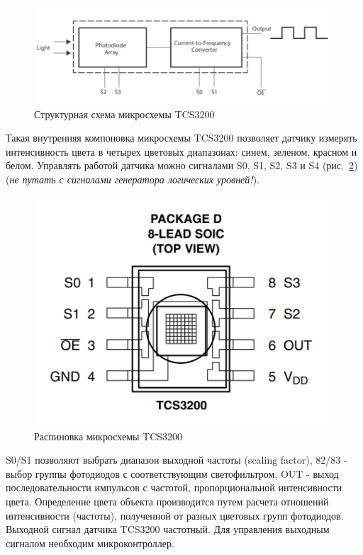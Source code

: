 \documentclass[12pt]{article}
\begin{document}
\begin{figure}[H]
    \centering
    \includegraphics[scale=0.7]{images/TCS3200_block.png}
    \caption{Структурная схема микросхемы TCS3200}\label{clrsensblock}
\end{figure}

Такая внутренняя компоновка микросхемы TCS3200 позволяет датчику измерять интенсивность цвета в четырех цветовых диапазонах: синем, зеленом, красном и белом. Управлять работой датчика можно сигналами S0, S1, S2, S3 и S4 (рис.~\ref{clrsensPin}) (\textit{не путать с сигналами генератора логических уровней!}).

\begin{figure}[H]
    \centering
    \includegraphics[scale=0.5]{images/TCS3200_pinout.png}
    \caption{Распиновка микросхемы TCS3200}\label{clrsensPin}
\end{figure}

S0/S1 позволяют выбрать диапазон выходной частоты (scaling factor), 82/83 - выбор группы фотодиодов с соответствующим светофильтром, OUT - выход последовательности импульсов с частотой, пропорциональной интенсивности цвета. Определение цвета объекта производится путем расчета отношений интенсивности (частоты), полученной от разных цветовых групп фотодиодов. Выходной сигнал датчика TCS3200 частотный. Для управления выходным сигналом необходим микроконтроллер.
\end{document}
